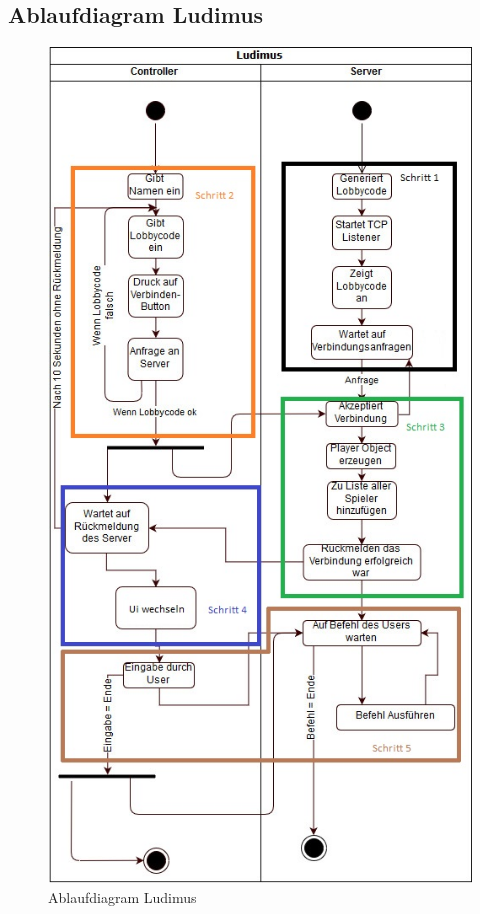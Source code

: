 \subsection{Ablaufdiagram Ludimus}
\begin{figure}
    \includegraphics[scale=1.5]{images/Sequence1.jpg}
    \caption{Ablaufdiagram Ludimus}
    \label{img:Ablauf}
\end{figure}
